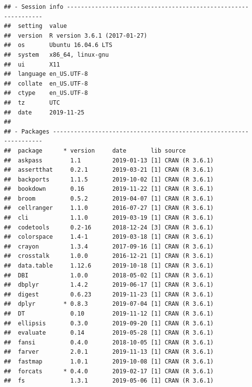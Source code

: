 \documentclass[]{book}
\begin{document}
\begin{verbatim}
## - Session info ---------------------------------------------------------------
##  setting  value                       
##  version  R version 3.6.1 (2017-01-27)
##  os       Ubuntu 16.04.6 LTS          
##  system   x86_64, linux-gnu           
##  ui       X11                         
##  language en_US.UTF-8                 
##  collate  en_US.UTF-8                 
##  ctype    en_US.UTF-8                 
##  tz       UTC                         
##  date     2019-11-25                  
## 
## - Packages -------------------------------------------------------------------
##  package      * version     date       lib source                           
##  askpass        1.1         2019-01-13 [1] CRAN (R 3.6.1)                   
##  assertthat     0.2.1       2019-03-21 [1] CRAN (R 3.6.1)                   
##  backports      1.1.5       2019-10-02 [1] CRAN (R 3.6.1)                   
##  bookdown       0.16        2019-11-22 [1] CRAN (R 3.6.1)                   
##  broom          0.5.2       2019-04-07 [1] CRAN (R 3.6.1)                   
##  cellranger     1.1.0       2016-07-27 [1] CRAN (R 3.6.1)                   
##  cli            1.1.0       2019-03-19 [1] CRAN (R 3.6.1)                   
##  codetools      0.2-16      2018-12-24 [3] CRAN (R 3.6.1)                   
##  colorspace     1.4-1       2019-03-18 [1] CRAN (R 3.6.1)                   
##  crayon         1.3.4       2017-09-16 [1] CRAN (R 3.6.1)                   
##  crosstalk      1.0.0       2016-12-21 [1] CRAN (R 3.6.1)                   
##  data.table     1.12.6      2019-10-18 [1] CRAN (R 3.6.1)                   
##  DBI            1.0.0       2018-05-02 [1] CRAN (R 3.6.1)                   
##  dbplyr         1.4.2       2019-06-17 [1] CRAN (R 3.6.1)                   
##  digest         0.6.23      2019-11-23 [1] CRAN (R 3.6.1)                   
##  dplyr        * 0.8.3       2019-07-04 [1] CRAN (R 3.6.1)                   
##  DT             0.10        2019-11-12 [1] CRAN (R 3.6.1)                   
##  ellipsis       0.3.0       2019-09-20 [1] CRAN (R 3.6.1)                   
##  evaluate       0.14        2019-05-28 [1] CRAN (R 3.6.1)                   
##  fansi          0.4.0       2018-10-05 [1] CRAN (R 3.6.1)                   
##  farver         2.0.1       2019-11-13 [1] CRAN (R 3.6.1)                   
##  fastmap        1.0.1       2019-10-08 [1] CRAN (R 3.6.1)                   
##  forcats      * 0.4.0       2019-02-17 [1] CRAN (R 3.6.1)                   
##  fs             1.3.1       2019-05-06 [1] CRAN (R 3.6.1)                   

\end{verbatim}
\end{document}
